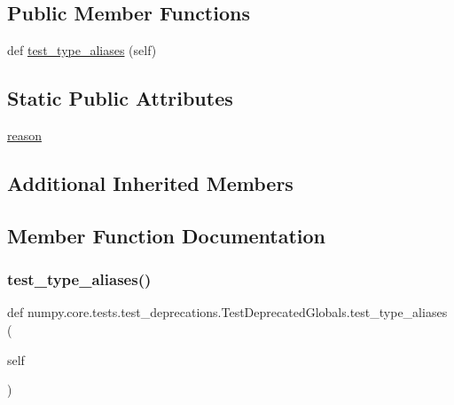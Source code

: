 \subsection*{Public Member Functions}
\begin{DoxyCompactItemize}
\item 
def \hyperlink{classnumpy_1_1core_1_1tests_1_1test__deprecations_1_1TestDeprecatedGlobals_a1b92a66627d6b299260acdad213fca76}{test\+\_\+type\+\_\+aliases} (self)
\end{DoxyCompactItemize}
\subsection*{Static Public Attributes}
\begin{DoxyCompactItemize}
\item 
\hyperlink{classnumpy_1_1core_1_1tests_1_1test__deprecations_1_1TestDeprecatedGlobals_a2ec2e3ad1890573b3478d483e4d7adac}{reason}
\end{DoxyCompactItemize}
\subsection*{Additional Inherited Members}


\subsection{Member Function Documentation}
\mbox{\label{classnumpy_1_1core_1_1tests_1_1test__deprecations_1_1TestDeprecatedGlobals_a1b92a66627d6b299260acdad213fca76}} 
\subsubsection{\texorpdfstring{test\+\_\+type\+\_\+aliases()}{test\_type\_aliases()}}
{\footnotesize\ttfamily def numpy.\+core.\+tests.\+test\+\_\+deprecations.\+Test\+Deprecated\+Globals.\+test\+\_\+type\+\_\+aliases (\begin{DoxyParamCaption}\item[{}]{self }\end{DoxyParamCaption})}



